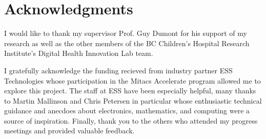 
\chapter{Acknowledgments}

I would like to thank my supervisor Prof. Guy Dumont for his support of my research as well as the other members of the BC Children's Hospital Research Institute's Digital Health Innovation Lab team.

I gratefully acknowledge the funding recieved from industry partner ESS Technologies whose participation in the Mitacs Accelerate program allowed me to explore this project. The staff at ESS have been especially helpful, many thanks to Martin Mallinson and Chris Petersen in particular whose enthusiastic technical guidance and anecdoes about electronics, mathematics, and computing were a source of inspiration. Finally, thank you to the others who attended my progress meetings and provided valuable feedback.
